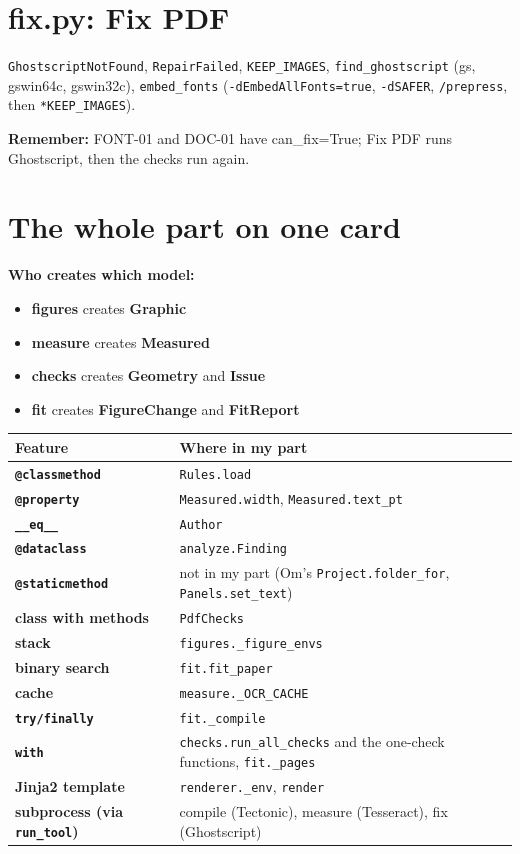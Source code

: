 \documentclass[10.5pt,a4paper]{article}
\newcommand{\cc}[1]{\texttt{#1}}
\newcommand{\remember}[1]{\par\smallskip\noindent\colorbox{soft}{\parbox{\dimexpr\linewidth-2\fboxsep}{\textbf{\color{slate}Remember:} #1}}\par\smallskip}
\begin{document}
\section{fix.py: Fix PDF}
\cc{GhostscriptNotFound}, \cc{RepairFailed}, \cc{KEEP\_IMAGES}, \cc{find\_ghostscript} (gs, gswin64c, gswin32c), \cc{embed\_fonts} (\cc{-dEmbedAllFonts=true}, \cc{-dSAFER}, \cc{/prepress}, then \cc{*KEEP\_IMAGES}).
\remember{FONT-01 and DOC-01 have can\_fix=True; Fix PDF runs Ghostscript, then the checks run again.}

\section{The whole part on one card}
\textbf{Who creates which model:}
\begin{itemize}
\item \textbf{figures} creates \textbf{Graphic}
\item \textbf{measure} creates \textbf{Measured}
\item \textbf{checks} creates \textbf{Geometry} and \textbf{Issue}
\item \textbf{fit} creates \textbf{FigureChange} and \textbf{FitReport}
\end{itemize}

\begin{tabularx}{\linewidth}{>{\bfseries}l X}
\toprule
Feature & Where in my part\\
\midrule
\cc{@classmethod} & \cc{Rules.load}\\
\cc{@property} & \cc{Measured.width}, \cc{Measured.text\_pt}\\
\cc{\_\_eq\_\_} & \cc{Author}\\
\cc{@dataclass} & \cc{analyze.Finding}\\
\cc{@staticmethod} & not in my part (Om's \cc{Project.folder\_for}, \cc{Panels.set\_text})\\
class with methods & \cc{PdfChecks}\\
stack & \cc{figures.\_figure\_envs}\\
binary search & \cc{fit.fit\_paper}\\
cache & \cc{measure.\_OCR\_CACHE}\\
\cc{try/finally} & \cc{fit.\_compile}\\
\cc{with} & \cc{checks.run\_all\_checks} and the one-check functions, \cc{fit.\_pages}\\
Jinja2 template & \cc{renderer.\_env}, \cc{render}\\
subprocess (via \cc{run\_tool}) & compile (Tectonic), measure (Tesseract), fix (Ghostscript)\\
\bottomrule
\end{tabularx}
\end{document}
